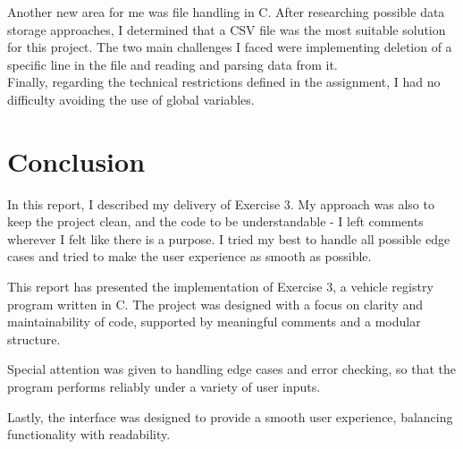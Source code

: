 \documentclass[12pt, a4paper]{article}
\begin{document}
Another new area for me was file handling in C. After researching possible data storage approaches, I determined that a CSV file was the most suitable solution for this project. The two main challenges I faced were implementing deletion of a specific line in the file and reading and parsing data from it. \\

Finally, regarding the technical restrictions defined in the assignment, I had no difficulty avoiding the use of global variables.

\section{Conclusion}

In this report, I described my delivery of Exercise 3. My approach was also to keep the project clean, and the code to be understandable - I left comments wherever I felt like there is a purpose. I tried my best to handle all possible edge cases and tried to make the user experience as smooth as possible. 

This report has presented the implementation of Exercise 3, a vehicle registry program written in C. The project was designed with a focus on clarity and maintainability of code, supported by meaningful comments and a modular structure. 

Special attention was given to handling edge cases and error checking, so that the program performs reliably under a variety of user inputs. 

Lastly, the interface was designed to provide a smooth user experience, balancing functionality with readability.


\end{document}
